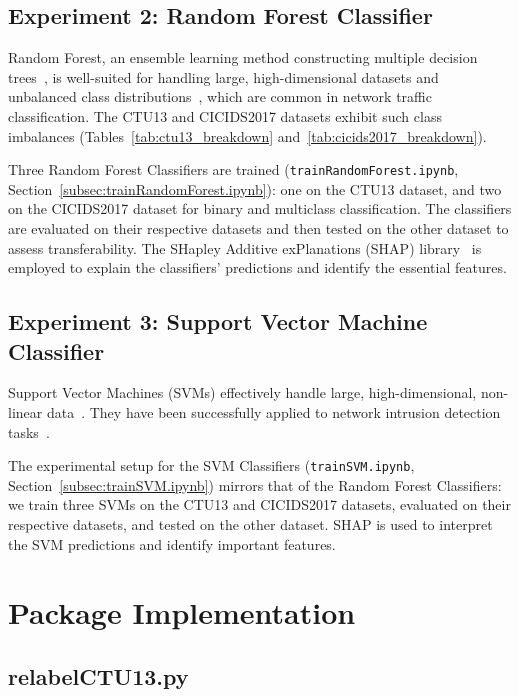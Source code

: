 \subsection{Experiment 2: Random Forest Classifier}\label{subsec:random-forest-classifier}

Random Forest, an ensemble learning method constructing multiple decision trees~\cite{hastie2009random}, is well-suited for handling large, high-dimensional datasets and unbalanced class distributions~\cite{farnaaz2016random}, which are common in network traffic classification. The CTU13 and CICIDS2017 datasets exhibit such class imbalances (Tables~\ref{tab:ctu13_breakdown} and~\ref{tab:cicids2017_breakdown}).

Three Random Forest Classifiers are trained (\texttt{trainRandomForest.ipynb}, Section~\ref{subsec:trainRandomForest.ipynb}): one on the CTU13 dataset, and two on the CICIDS2017 dataset for binary and multiclass classification. The classifiers are evaluated on their respective datasets and then tested on the other dataset to assess transferability. The SHapley Additive exPlanations (SHAP) library~\cite{lundberg2017unified} is employed to explain the classifiers' predictions and identify the essential features.

\subsection{Experiment 3: Support Vector Machine Classifier}\label{subsec:support-vector-machine-classifier}

Support Vector Machines (SVMs) effectively handle large, high-dimensional, non-linear data~\cite{cortes1995support, scholkopf2002learning}. They have been successfully applied to network intrusion detection tasks~\cite{kim2003network, teng2017svm}.

The experimental setup for the SVM Classifiers (\texttt{trainSVM.ipynb}, Section~\ref{subsec:trainSVM.ipynb}) mirrors that of the Random Forest Classifiers: we train three SVMs on the CTU13 and CICIDS2017 datasets, evaluated on their respective datasets, and tested on the other dataset. SHAP is used to interpret the SVM predictions and identify important features.

\section{Package Implementation}\label{sec:package-implementation}

\subsection{relabelCTU13.py}\label{subsec:relabelCTU13.py}

